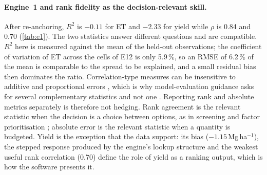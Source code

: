 \documentclass[preprint,12pt]{elsarticle}
\begin{document}
\paragraph{Engine~1 and rank fidelity as the decision-relevant skill.} After re-anchoring, $R^2$ is $-0.11$ for ET and $-2.33$ for yield while $\rho$ is 0.84 and 0.70 (\cref{tab:e1}). The two statistics answer different questions and are compatible. $R^2$ here is measured against the mean of the held-out observations; the coefficient of variation of ET across the cells of E12 is only 5.9\,\%, so an RMSE of 6.2\,\% of the mean is comparable to the spread to be explained, and a small residual bias then dominates the ratio. Correlation-type measures can be insensitive to additive and proportional errors \cite{Legates1999}, which is why model-evaluation guidance asks for several complementary statistics and not one \cite{Moriasi2007,Bennett2013}. Reporting rank and absolute metrics separately is therefore not hedging. Rank agreement is the relevant statistic when the decision is a choice between options, as in screening and factor prioritisation \cite{Saltelli2008}; absolute error is the relevant statistic when a quantity is budgeted. Yield is the exception that the data support: its bias ($-1.15$\,Mg\,ha$^{-1}$), the stepped response produced by the engine's lookup structure and the weakest useful rank correlation (0.70) define the role of yield as a ranking output, which is how the software presents it.
\end{document}
